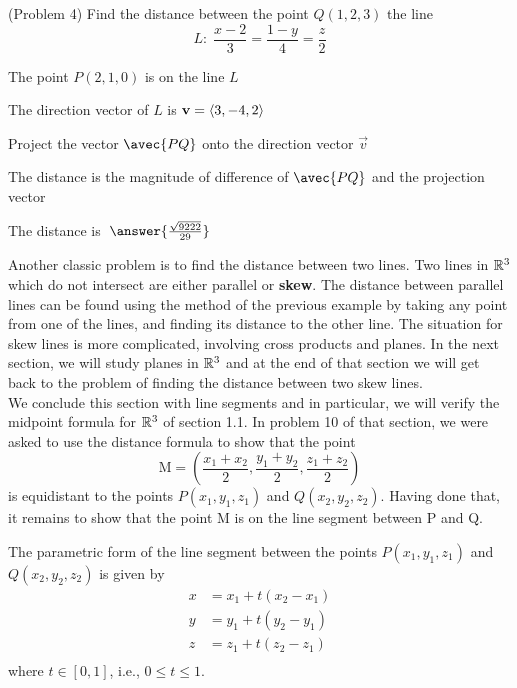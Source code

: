 \documentclass[handout]{ximera}
\begin{document}
\begin{problem}(Problem 4)
Find the distance between the point $Q(1, 2, 3)$ the line 
\[
L: \; \frac{x- 2}{3} = \frac{1-y}{4} = \frac{z}{2}
\]
\begin{hint}
The point $P(2, 1, 0)$ is on the line $L$
\end{hint}
\begin{hint}
The direction vector of $L$ is $\mathbf v = \left\langle 3, -4, 2\right\rangle$
\end{hint}
\begin{hint}
Project the vector $\avec{PQ}$ onto the direction vector $\vec v$
\end{hint}
\begin{hint}
The distance is the magnitude of difference of $\avec{PQ}$ and the projection vector
\end{hint}
The distance is $\; \answer{\frac{\sqrt{9222}}{29}}$
\end{problem}

Another classic problem is to find the distance between two lines.
Two lines in $\mathbb R^3$ which do not intersect are either parallel or {\bf skew}.  
The distance between parallel lines can be found using the method of the previous example by 
taking any point from one of the lines,
and finding its distance to the other line.
The situation for skew lines is more complicated, involving cross products and planes.
In the next section, we will study planes in $\mathbb R^3$ and at the end of that section we will get back to the 
problem of finding the distance between two skew lines.\\
We conclude this section with line segments and in particular, we will verify the 
midpoint formula for $\mathbb R^3$ of section 1.1.  In problem 10 of that section, we were asked to use the distance formula to 
show that the point 
\[
\text{M} = \left(\frac{x_1 + x_2}{2}, \frac{y_1 + y_2}{2}, \frac{z_1 + z_2}{2}\right)
\]
is equidistant to the points $P(x_1, y_1, z_1)$ and $Q(x_2, y_2, z_2)$. 
Having done that, it remains to show that the point M is on the line segment between P and Q.

\begin{definition}
The parametric form of the line segment between the points $P(x_1, y_1, z_1)$ and $Q(x_2, y_2, z_2)$
is given by
\begin{align*}
x &= x_1 + t(x_2 - x_1)\\
y &= y_1 + t(y_2 - y_1)\\
z &= z_1 + t(z_2 - z_1)\\
\end{align*}
where $t \in [0,1]$, i.e., $0 \leq t \leq 1$.
\end{definition}
\end{document}
